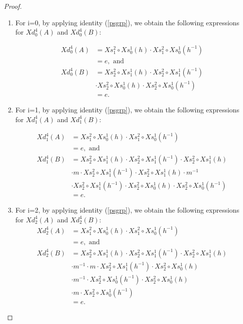 \documentclass{tac}
\begin{document}
\begin{proof}
\begin{enumerate}[label=(\roman*)]
\item For i=0, by applying identity (\ref{psgrp}), we obtain the following expressions for $Xd^4_0(A)$ and $Xd^4_0(B)$:

\begin{align*}
Xd^4_0 (A) &=
Xs^2_1\circ Xs^1_0(h)\cdot Xs^2_1\circ Xs^1_0(h^{-1})\\
&=e, \text{ and} \\
Xd^4_0 (B) &=
Xs^2_2\circ Xs^1_1(h)\cdot Xs^2_2\circ Xs^1_1(h^{-1})\\
&\cdot Xs^2_2\circ Xs^1_0(h)\cdot Xs^2_2\circ Xs^1_0(h^{-1})\\
&=e.
\end{align*}

\item For i=1, by applying identity (\ref{psgrp}), we obtain the following expressions for $Xd^4_1(A)$ and $Xd^4_1(B)$:

\begin{align*}
Xd^4_1 (A) &=
Xs^2_1\circ Xs^1_0(h)\cdot Xs^2_1\circ Xs^1_0(h^{-1})\\
&=e, \text{ and}\\
Xd^4_1 (B) &=
Xs^2_2\circ Xs^1_1(h)\cdot Xs^2_2\circ Xs^1_1(h^{-1})\cdot Xs^2_2\circ Xs^1_1(h)\\
&\cdot m\cdot Xs^2_2\circ Xs^1_1(h^{-1})\cdot Xs^2_2\circ Xs^1_1(h)\cdot m^{-1}\\
&\cdot Xs^2_2\circ Xs^1_1(h^{-1})\cdot Xs^2_2\circ Xs^1_0(h)\cdot Xs^2_2\circ Xs^1_0(h^{-1})\\
&=e.
\end{align*}

\item For i=2, by applying identity (\ref{psgrp}), we obtain the following expressions for $Xd^4_2(A)$ and $Xd^4_2(B)$:
\begin{align*}
Xd^4_2 (A) &=
Xs^2_1\circ Xs^1_0(h)\cdot Xs^2_1\circ Xs^1_0(h^{-1})\\
&=e, \text{ and}\\
Xd^4_2 (B) &=
Xs^2_2\circ Xs^1_1(h)\cdot Xs^2_2\circ Xs^1_1(h^{-1})\cdot Xs^2_2\circ Xs^1_1(h)\\
&\cdot m^{-1}\cdot m\cdot Xs^2_2\circ Xs^1_1(h^{-1})\cdot Xs^2_2\circ Xs^1_0(h)\\
&\cdot m^{-1}\cdot Xs^2_2\circ Xs^1_0(h^{-1})\cdot Xs^2_2\circ Xs^1_0(h)\\
&\cdot m\cdot Xs^2_2\circ Xs^1_0(h^{-1})\\
&=e.
\end{align*}


\end{enumerate}
\end{proof}
\end{document}
